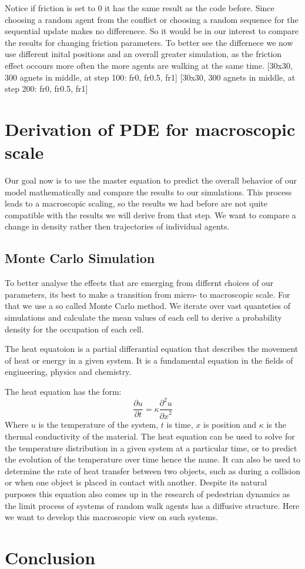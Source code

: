 Notice if friction is set to 0 it has the same result as the code before. 
Since choosing a random agent from the conflict or choosing a random sequence for the sequential update makes no differenece. 
So it would be in our interest to compare the results for changing friction parameters.
To better see the differnece we now use different inital positions and an overall greater simulation, 
as the friction effect occours more often the more agents are walking at the same time. 
[30x30, 300 agnets in middle, at step 100: fr0, fr0.5, fr1] 
[30x30, 300 agnets in middle, at step 200: fr0, fr0.5, fr1] 

\newpage
\section{Derivation of PDE for macroscopic scale}
Our goal now is to use the master equation to predict the overall behavior of our model mathematically and compare the results to our simulations. 
This process leads to a macroscopic scaling, so the results we had before are not quite compatible with the results we will derive from that step.
We want to compare a change in density rather then trajectories of individual agents. 

\subsection{Monte Carlo Simulation}
To better analyse the effects that are emerging from differnt choices of our parameters, 
its best to make a transition from micro- to macroscopic scale.
For that we use a so called Monte Carlo method. We iterate over vast quanteties of simulations and calculate the mean values of each cell 
to derive a probability density for the occupation of each cell. 

The heat equatoion is a partial differantial equation that describes the movement of heat or energy in a given system.
It is a fundamental equation in the fields of engineering, physics and chemistry.

The heat equation has the form: 
\begin{equation}
\frac{\partial u}{\partial t} = \kappa \frac{{\partial}^2u}{{\partial x}^2}
\end{equation}
Where $u$ is the temperature of the system, $t$ is time, $x$ is position and $\kappa$ is the thermal conductivity of the material.
The heat equation can be used to solve for the temperature distribution in a given system at a particular time, or to predict the evolution 
of the temperature over time hence the name. It can also be used to determine the rate of heat transfer between two objects, such as during a 
collision or when one object is placed in contact with another.
Despite its natural purposes this equation also comes up in the research of pedestrian dynamics as the limit process of systems of random walk agents 
has a diffusive structure. Here we want to develop this macroscopic view on such systems.


\newpage
\section{Conclusion}


\newpage





